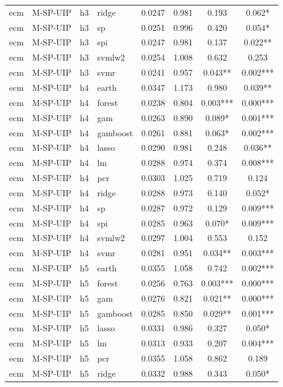 \begin{ThreePartTable}
\begin{longtable}[t]{llclcccc}
ecm & M-SP-UIP & h3 & ridge & 0.0247 & 0.981 & 0.193 & 0.062*\\
ecm & M-SP-UIP & h3 & sp & 0.0251 & 0.996 & 0.420 & 0.054*\\
ecm & M-SP-UIP & h3 & spi & 0.0247 & 0.981 & 0.137 & 0.022**\\
ecm & M-SP-UIP & h3 & svmlw2 & 0.0254 & 1.008 & 0.632 & 0.253\\
ecm & M-SP-UIP & h3 & svmr & 0.0241 & 0.957 & 0.043** & 0.002***\\
\addlinespace
ecm & M-SP-UIP & h4 & earth & 0.0347 & 1.173 & 0.980 & 0.039**\\
ecm & M-SP-UIP & h4 & forest & 0.0238 & 0.804 & 0.003*** & 0.000***\\
ecm & M-SP-UIP & h4 & gam & 0.0263 & 0.890 & 0.089* & 0.001***\\
ecm & M-SP-UIP & h4 & gamboost & 0.0261 & 0.881 & 0.063* & 0.002***\\
ecm & M-SP-UIP & h4 & lasso & 0.0290 & 0.981 & 0.248 & 0.036**\\
ecm & M-SP-UIP & h4 & lm & 0.0288 & 0.974 & 0.374 & 0.008***\\
ecm & M-SP-UIP & h4 & pcr & 0.0303 & 1.025 & 0.719 & 0.124\\
ecm & M-SP-UIP & h4 & ridge & 0.0288 & 0.973 & 0.140 & 0.052*\\
ecm & M-SP-UIP & h4 & sp & 0.0287 & 0.972 & 0.129 & 0.009***\\
ecm & M-SP-UIP & h4 & spi & 0.0285 & 0.963 & 0.070* & 0.009***\\
ecm & M-SP-UIP & h4 & svmlw2 & 0.0297 & 1.004 & 0.553 & 0.152\\
ecm & M-SP-UIP & h4 & svmr & 0.0281 & 0.951 & 0.034** & 0.003***\\
\addlinespace
ecm & M-SP-UIP & h5 & earth & 0.0355 & 1.058 & 0.742 & 0.002***\\
ecm & M-SP-UIP & h5 & forest & 0.0256 & 0.763 & 0.003*** & 0.000***\\
ecm & M-SP-UIP & h5 & gam & 0.0276 & 0.821 & 0.021** & 0.000***\\
ecm & M-SP-UIP & h5 & gamboost & 0.0285 & 0.850 & 0.029** & 0.001***\\
ecm & M-SP-UIP & h5 & lasso & 0.0331 & 0.986 & 0.327 & 0.050*\\
ecm & M-SP-UIP & h5 & lm & 0.0313 & 0.933 & 0.207 & 0.004***\\
ecm & M-SP-UIP & h5 & pcr & 0.0355 & 1.058 & 0.862 & 0.189\\
ecm & M-SP-UIP & h5 & ridge & 0.0332 & 0.988 & 0.343 & 0.050*\\

\end{longtable}
\end{ThreePartTable}
